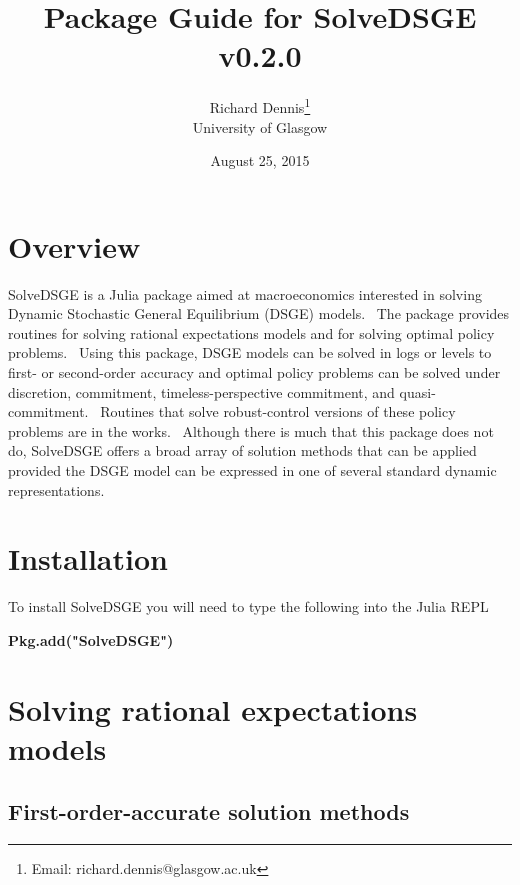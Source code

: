 \documentclass[thmsa,notitlepage,11pt]{article}
\begin{document}
\author{Richard Dennis\thanks{%
Email: richard.dennis@glasgow.ac.uk} \\
University of Glasgow}
\title{\textbf{Package Guide for SolveDSGE v0.2.0}\vspace{0.2in}}
\date{August 25, 2015}
\maketitle

\thispagestyle{empty}\newpage \setlength{\baselineskip}{18.95pt}%
\setcounter{page}{1}

\section{Overview}

SolveDSGE is a Julia package aimed at macroeconomics interested in solving
Dynamic Stochastic General Equilibrium (DSGE) models. \ The package provides
routines for solving rational expectations models and for solving optimal
policy problems. \ Using this package, DSGE models can be solved in logs or
levels to first- or second-order accuracy and optimal policy problems can be
solved under discretion, commitment, timeless-perspective commitment, and
quasi-commitment. \ Routines that solve robust-control versions of these
policy problems are in the works. \ Although there is much that this package
does not do, SolveDSGE offers a broad array of solution methods that can be
applied provided the DSGE model can be expressed in one of several standard
dynamic representations.

\section{Installation}

To install SolveDSGE you will need to type the following into the Julia REPL

\bigskip

\textbf{Pkg.add("SolveDSGE")}

\bigskip

\section{Solving rational expectations models}

\subsection{First-order-accurate solution methods}
\end{document}
